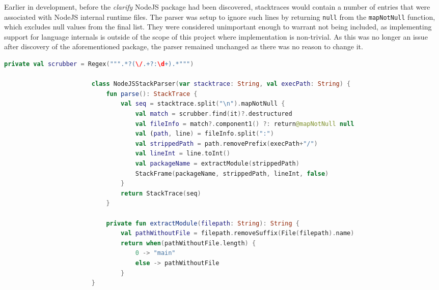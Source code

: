 \documentclass[12pt,pdftex,titlepage]{report}
\begin{document}
                Earlier in development, before the \textit{clarify}\cite{clarify} NodeJS package had been discovered, stacktraces would contain a number of entries that were associated with NodeJS internal 
                runtime files. The parser was setup to ignore such lines by returning \texttt{null} from the \texttt{mapNotNull} function, which excludes null values from the final list. They were considered unimportant 
                enough to warrant not being included, as implementing support for language internals is outside of the scope of this project where implementation is non-trivial. As this was no longer an issue
                after discovery of the aforementioned package, the parser remained unchanged as there was no reason to change it.

                \newpage
                \begin{spacing}{1.0}
                    \begin{lstlisting}[language=Kotlin, gobble=24, label={lst:nodeparser}, caption={The NodeJS stack parser class}]
                        private val scrubber = Regex(""".*?(\/.+?:\d+).*""")

                        class NodeJSStackParser(var stacktrace: String, val execPath: String) {
                            fun parse(): StackTrace {
                                val seq = stacktrace.split("\n").mapNotNull {
                                    val match = scrubber.find(it)?.destructured
                                    val fileInfo = match?.component1() ?: return@mapNotNull null
                                    val (path, line) = fileInfo.split(":")
                                    val strippedPath = path.removePrefix(execPath+"/")
                                    val lineInt = line.toInt()
                                    val packageName = extractModule(strippedPath)
                                    StackFrame(packageName, strippedPath, lineInt, false)
                                }
                                return StackTrace(seq)
                            }
                            
                            private fun extractModule(filepath: String): String {
                                val pathWithoutFile = filepath.removeSuffix(File(filepath).name)
                                return when(pathWithoutFile.length) {
                                    0 -> "main"
                                    else -> pathWithoutFile
                                }
                        }
                    \end{lstlisting}
                \end{spacing}
                \bigskip
\end{document}
